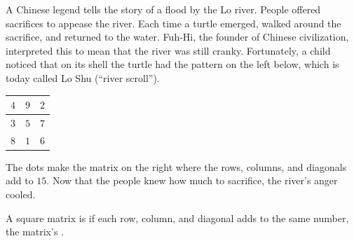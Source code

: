 A Chinese legend tells the story of a  
flood by the Lo river.
People offered sacrifices to appease the river.
Each time a turtle emerged, 
walked around the sacrifice, and returned to the water.
Fuh-Hi, %
the founder of Chinese civilization,
interpreted this to mean that
the river was still cranky.  
Fortunately, a child noticed 
that on its shell the turtle had the pattern on the left below, which is today
called Lo Shu (``river scroll'').
\begin{center}
  \hspace{.8in}
  \begin{tabular}{|c|c|c|}
    \hline
      $4$  &$9$  &$2$  \\ \hline
      $3$  &$5$  &$7$  \\ \hline
      $8$  &$1$  &$6$  \\ \hline    
  \end{tabular}
\end{center}
The dots make the matrix on the right where the
rows, columns, 
and diagonals add to $15$.
Now that the people knew how much to sacrifice, 
the river's anger cooled.

A square matrix is 
if each row, column, and diagonal adds to the same
number, the matrix's .

